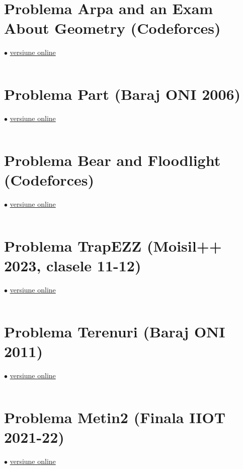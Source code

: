 \documentclass[../main.tex]{subfiles}
\begin{document}
\inputminted{cpp}{../src/geometry/elicoptere.cpp}

\section{Problema Arpa and an Exam About Geometry (Codeforces)}
\label{code:arpa-and-an-exam}
$\bullet$
\href{https://codeforces.com/contest/851/submission/361762767}{versiune online}

\inputminted{cpp}{../src/geometry/arpa-and-an-exam.cpp}

\section{Problema Part (Baraj ONI 2006)}
\label{code:part}
$\bullet$
\href{https://kilonova.ro/submissions/949550}{versiune online}

\inputminted{cpp}{../src/geometry/part.cpp}

\section{Problema Bear and Floodlight (Codeforces)}
\label{code:bear-and-floodlight}
$\bullet$
\href{https://codeforces.com/contest/385/submission/312221735}{versiune online}

\inputminted{cpp}{../src/geometry/bear-and-floodlight.cpp}

\section{Problema TrapEZZ (Moisil++ 2023, clasele 11-12)}
\label{code:trapezz}
$\bullet$
\href{https://kilonova.ro/submissions/302677}{versiune online}

\inputminted{cpp}{../src/geometry/trapezz.cpp}

\section{Problema Terenuri (Baraj ONI 2011)}
\label{code:terenuri}
$\bullet$
\href{https://kilonova.ro/submissions/945398}{versiune online}

\inputminted{cpp}{../src/geometry/terenuri.cpp}

\section{Problema Metin2 (Finala IIOT 2021-22)}
\label{code:metin2}
$\bullet$
\href{https://kilonova.ro/submissions/261809}{versiune online}

\inputminted{cpp}{../src/geometry/metin2.cpp}
\end{document}
